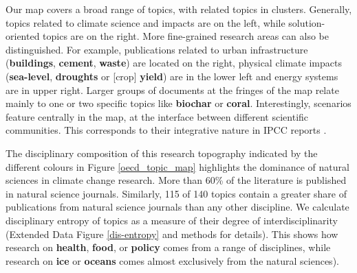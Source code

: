 \documentclass{article}
\begin{document}
\begin{linenumbers}
		
		
		Our map covers a broad range of topics, with related topics in clusters. Generally, topics related to climate science and impacts are on the left, while solution-oriented topics are on the right. More fine-grained research areas can also be distinguished. For example, publications related to urban infrastructure (\textbf{buildings}, \textbf{cement}, \textbf{waste}) are located on the right, physical climate impacts (\textbf{sea-level}, \textbf{droughts}  or [crop] \textbf{yield}) are in the lower left and energy systems are in upper right. Larger groups of documents at the fringes of the map relate mainly to one or two specific topics like \textbf{biochar} or \textbf{coral}. Interestingly, scenarios feature centrally in the map, at the interface between different scientific communities. This corresponds to their integrative nature in IPCC reports \cite{Moss2010}. %
		
		
		The disciplinary composition of this research topography indicated by the different colours in Figure \ref{oecd_topic_map} highlights the dominance of natural sciences in climate change research. More than 60\% of the literature is published in natural science journals. Similarly, 115 of 140 topics contain a greater share of publications from natural science journals than any other discipline. We calculate disciplinary entropy of topics as a measure of their degree of interdisciplinarity (Extended Data Figure \ref{dis-entropy} and methods for details). This shows how research on \textbf{health}, \textbf{food}, or \textbf{policy} comes from a range of disciplines, while research on \textbf{ice} or \textbf{oceans} comes almost exclusively from the natural sciences). 
		

\end{linenumbers}
\end{document}
